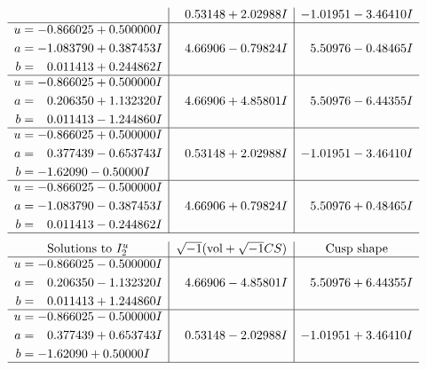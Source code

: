 \documentclass[1p]{elsarticle_modified}
\theoremstyle{definition}
\newcommand{\I}{\sqrt{-1}}
\begin{document}
$$\begin{array}{c|c|c}
 & \phantom{-}0.53148 + 2.02988 I & -1.01951 - 3.46410 I \\ \hline\begin{aligned}
u &= -0.866025 + 0.500000 I \\
a &= -1.083790 + 0.387453 I \\
b &= \phantom{-}0.011413 + 0.244862 I\end{aligned}
 & \phantom{-}4.66906 - 0.79824 I & \phantom{-}5.50976 - 0.48465 I \\ \hline\begin{aligned}
u &= -0.866025 + 0.500000 I \\
a &= \phantom{-}0.206350 + 1.132320 I \\
b &= \phantom{-}0.011413 - 1.244860 I\end{aligned}
 & \phantom{-}4.66906 + 4.85801 I & \phantom{-}5.50976 - 6.44355 I \\ \hline\begin{aligned}
u &= -0.866025 + 0.500000 I \\
a &= \phantom{-}0.377439 - 0.653743 I \\
b &= -1.62090 - 0.50000 I\end{aligned}
 & \phantom{-}0.53148 + 2.02988 I & -1.01951 - 3.46410 I \\ \hline\begin{aligned}
u &= -0.866025 - 0.500000 I \\
a &= -1.083790 - 0.387453 I \\
b &= \phantom{-}0.011413 - 0.244862 I\end{aligned}
 & \phantom{-}4.66906 + 0.79824 I & \phantom{-}5.50976 + 0.48465 I\\
 \hline 
 \end{array}$$\newpage$$\begin{array}{c|c|c}  
\text{Solutions to }I^u_{2}& \I (\text{vol} + \sqrt{-1}CS) & \text{Cusp shape}\\
 \hline 
\begin{aligned}
u &= -0.866025 - 0.500000 I \\
a &= \phantom{-}0.206350 - 1.132320 I \\
b &= \phantom{-}0.011413 + 1.244860 I\end{aligned}
 & \phantom{-}4.66906 - 4.85801 I & \phantom{-}5.50976 + 6.44355 I \\ \hline\begin{aligned}
u &= -0.866025 - 0.500000 I \\
a &= \phantom{-}0.377439 + 0.653743 I \\
b &= -1.62090 + 0.50000 I\end{aligned}
 & \phantom{-}0.53148 - 2.02988 I & -1.01951 + 3.46410 I\\
 \hline 
 \end{array}$$\newpage
\end{document}
